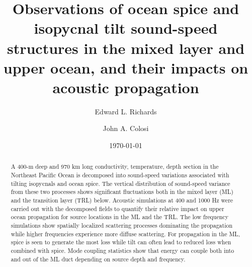 \documentclass[preprint,NumberedRefs]{JASA}
\begin{document}
\title[Mixed layer tilt and spice]{Observations of ocean spice and isopycnal tilt sound-speed structures in the mixed layer and upper ocean, and their impacts on acoustic propagation}
\author{Edward L. Richards}
\author{John A. Colosi}

\date{\today}

\begin{abstract}
A 400-m deep and 970 km long conductivity, temperature, depth section in the Northeast Pacific Ocean is decomposed into sound-speed variations associated with tilting isopycnals and ocean spice. The vertical distribution of sound-speed variance from these two processes shows significant fluctuations both in the mixed layer (ML) and the transition layer (TRL) below. Acoustic simulations at 400 and 1000 Hz were carried out with the decomposed fields to quantify their relative impact on upper ocean propagation for source locations in the ML and the TRL. The low frequency simulations show spatially localized scattering processes dominating the propagation while higher frequencies experience more diffuse scattering. For propagation in the ML, spice is seen to generate the most loss while tilt can often lead to reduced loss when combined with spice. Mode coupling statistics show that energy can couple both into and out of the ML duct depending on source depth and frequency.
\end{abstract}

\maketitle
\end{document}
